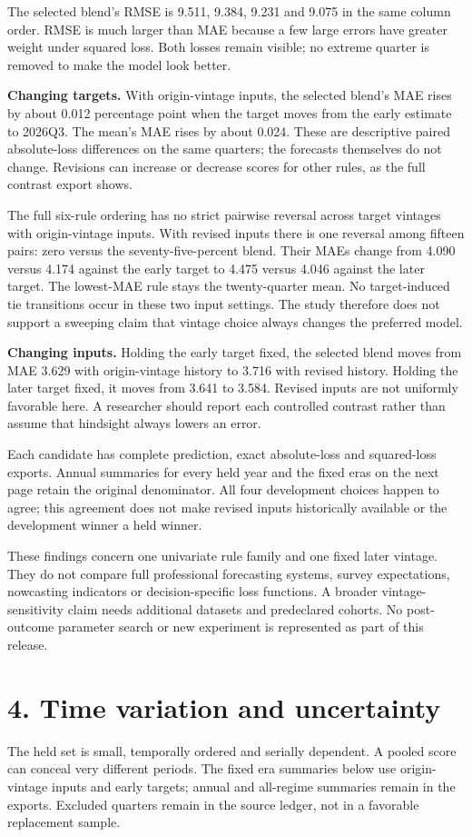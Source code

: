 \documentclass[10pt,letterpaper]{article}
\begin{document}
The selected blend's RMSE is 9.511, 9.384, 9.231 and 9.075 in the same column order. RMSE is much larger than MAE because a few large errors have greater weight under squared loss. Both losses remain visible; no extreme quarter is removed to make the model look better.

\textbf{Changing targets.} With origin-vintage inputs, the selected blend's MAE rises by about 0.012 percentage point when the target moves from the early estimate to 2026Q3. The mean's MAE rises by about 0.024. These are descriptive paired absolute-loss differences on the same quarters; the forecasts themselves do not change. Revisions can increase or decrease scores for other rules, as the full contrast export shows.

The full six-rule ordering has no strict pairwise reversal across target vintages with origin-vintage inputs. With revised inputs there is one reversal among fifteen pairs: zero versus the seventy-five-percent blend. Their MAEs change from 4.090 versus 4.174 against the early target to 4.475 versus 4.046 against the later target. The lowest-MAE rule stays the twenty-quarter mean. No target-induced tie transitions occur in these two input settings. The study therefore does not support a sweeping claim that vintage choice always changes the preferred model.

\textbf{Changing inputs.} Holding the early target fixed, the selected blend moves from MAE 3.629 with origin-vintage history to 3.716 with revised history. Holding the later target fixed, it moves from 3.641 to 3.584. Revised inputs are not uniformly favorable here. A researcher should report each controlled contrast rather than assume that hindsight always lowers an error.

Each candidate has complete prediction, exact absolute-loss and squared-loss exports. Annual summaries for every held year and the fixed eras on the next page retain the original denominator. All four development choices happen to agree; this agreement does not make revised inputs historically available or the development winner a held winner.

These findings concern one univariate rule family and one fixed later vintage. They do not compare full professional forecasting systems, survey expectations, nowcasting indicators or decision-specific loss functions. A broader vintage-sensitivity claim needs additional datasets and predeclared cohorts. No post-outcome parameter search or new experiment is represented as part of this release.
\newpage
\section*{4. Time variation and uncertainty}
The held set is small, temporally ordered and serially dependent. A pooled score can conceal very different periods. The fixed era summaries below use origin-vintage inputs and early targets; annual and all-regime summaries remain in the exports. Excluded quarters remain in the source ledger, not in a favorable replacement sample.
\end{document}
